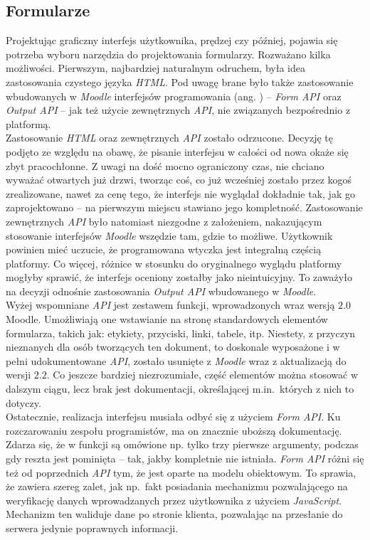 \subsection{Formularze}
\label{Chapter625}

Projektując graficzny interfejs użytkownika, prędzej czy później, pojawia się potrzeba wyboru narzędzia do projektowania formularzy. Rozważano kilka możliwości. Pierwszym, najbardziej naturalnym odruchem, była idea zastosowania czystego języka \textit{HTML}. Pod uwagę brane było także zastosowanie wbudowanych w \textit{Moodle} interfejsów programowania (ang. ) -- \textit{Form API} oraz \textit{Output API} -- jak też użycie zewnętrznych \textit{API}, nie związanych bezpośrednio z platformą. \\

Zastosowanie \textit{HTML} oraz zewnętrznych \textit{API} zostało odrzucone. Decyzję tę podjęto ze względu na obawę, że pisanie interfejsu w całości od nowa okaże się zbyt pracochłonne. Z uwagi na dość mocno ograniczony czas, nie chciano wyważać otwartych już drzwi, tworząc coś, co już wcześniej zostało przez kogoś zrealizowane, nawet za cenę tego, że interfejs nie wyglądał dokładnie tak, jak go zaprojektowano -- na pierwszym miejscu stawiano jego kompletność. Zastosowanie zewnętrznych \textit{API} było natomiast niezgodne z założeniem, nakazującym stosowanie interfejsów \textit{Moodle} wszędzie tam, gdzie to możliwe. Użytkownik powinien mieć uczucie, że programowana wtyczka jest integralną częścią platformy. Co więcej, różnice w stosunku do oryginalnego wyglądu platformy mogłyby sprawić, że interfejs oceniony zostałby jako nieintuicyjny. To zaważyło na decyzji odnośnie zastosowania \textit{Output API} wbudowanego w \textit{Moodle}. \\

Wyżej wspomniane \textit{API} jest zestawem funkcji, wprowadzonych wraz wersją $2.0$ Moodle. Umożliwiają one wstawianie na stronę standardowych elementów formularza, takich jak: etykiety, przyciski, linki, tabele, itp. Niestety, z przyczyn nieznanych dla osób tworzących ten dokument, to doskonale wyposażone i w pełni udokumentowane \textit{API}, zostało usunięte z \textit{Moodle} wraz z aktualizacją do wersji $2.2$. Co jeszcze bardziej niezrozumiałe, część elementów można stosować w dalszym ciągu, lecz brak jest dokumentacji, określającej m.in.~których z nich to dotyczy. \\

Ostatecznie, realizacja interfejsu musiała odbyć się z użyciem \textit{Form API}. Ku rozczarowaniu zespołu programistów, ma on znacznie uboższą dokumentację. Zdarza się, że w funkcji są omówione np. tylko trzy pierwsze argumenty, podczas gdy reszta jest pominięta -- tak, jakby kompletnie nie istniała. \textit{Form API} różni się też od poprzednich \textit{API} tym, że jest oparte na modelu obiektowym. To sprawia, że zawiera szereg zalet, jak np.~fakt posiadania mechanizmu pozwalającego na weryfikację danych wprowadzanych przez użytkownika z użyciem \textit{JavaScript}. Mechanizm ten waliduje dane po stronie klienta, pozwalając na przesłanie do serwera jedynie poprawnych informacji. \\

